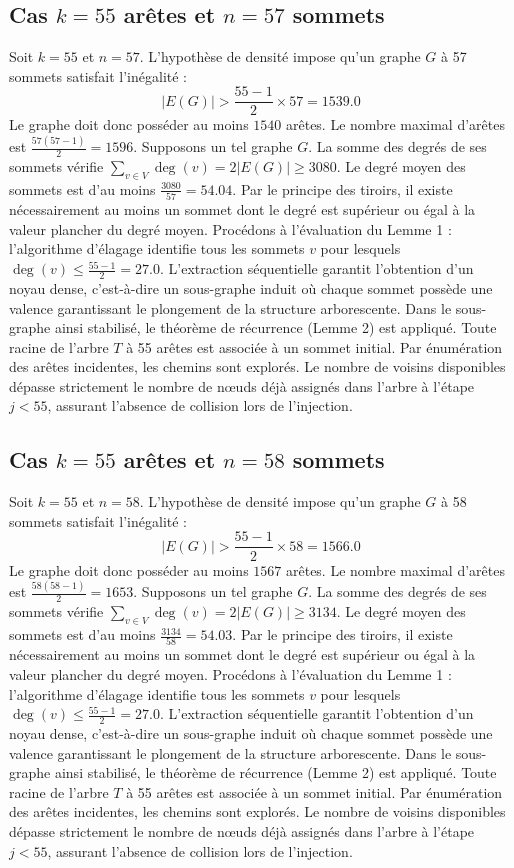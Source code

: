 \documentclass[12pt,a4paper]{article}
\begin{document}
\subsection{Cas $k = 55$ arêtes et $n = 57$ sommets}
Soit $k = 55$ et $n = 57$. L'hypothèse de densité impose qu'un graphe $G$ à 57 sommets satisfait l'inégalité :
$$ |E(G)| > \frac{55-1}{2} \times 57 = 1539.0 $$
Le graphe doit donc posséder au moins $1540$ arêtes. Le nombre maximal d'arêtes est $\frac{57(57-1)}{2} = 1596$.
Supposons un tel graphe $G$. La somme des degrés de ses sommets vérifie $\sum_{v \in V} \deg(v) = 2|E(G)| \geq 3080$.
Le degré moyen des sommets est d'au moins $\frac{3080}{57} = 54.04$.
Par le principe des tiroirs, il existe nécessairement au moins un sommet dont le degré est supérieur ou égal à la valeur plancher du degré moyen.
Procédons à l'évaluation du Lemme 1 : l'algorithme d'élagage identifie tous les sommets $v$ pour lesquels $\deg(v) \leq \frac{55-1}{2} = 27.0$.
L'extraction séquentielle garantit l'obtention d'un noyau dense, c'est-à-dire un sous-graphe induit où chaque sommet possède une valence garantissant le plongement de la structure arborescente.
Dans le sous-graphe ainsi stabilisé, le théorème de récurrence (Lemme 2) est appliqué. Toute racine de l'arbre $T$ à 55 arêtes est associée à un sommet initial. Par énumération des arêtes incidentes, les chemins sont explorés. Le nombre de voisins disponibles dépasse strictement le nombre de nœuds déjà assignés dans l'arbre à l'étape $j < 55$, assurant l'absence de collision lors de l'injection.

\subsection{Cas $k = 55$ arêtes et $n = 58$ sommets}
Soit $k = 55$ et $n = 58$. L'hypothèse de densité impose qu'un graphe $G$ à 58 sommets satisfait l'inégalité :
$$ |E(G)| > \frac{55-1}{2} \times 58 = 1566.0 $$
Le graphe doit donc posséder au moins $1567$ arêtes. Le nombre maximal d'arêtes est $\frac{58(58-1)}{2} = 1653$.
Supposons un tel graphe $G$. La somme des degrés de ses sommets vérifie $\sum_{v \in V} \deg(v) = 2|E(G)| \geq 3134$.
Le degré moyen des sommets est d'au moins $\frac{3134}{58} = 54.03$.
Par le principe des tiroirs, il existe nécessairement au moins un sommet dont le degré est supérieur ou égal à la valeur plancher du degré moyen.
Procédons à l'évaluation du Lemme 1 : l'algorithme d'élagage identifie tous les sommets $v$ pour lesquels $\deg(v) \leq \frac{55-1}{2} = 27.0$.
L'extraction séquentielle garantit l'obtention d'un noyau dense, c'est-à-dire un sous-graphe induit où chaque sommet possède une valence garantissant le plongement de la structure arborescente.
Dans le sous-graphe ainsi stabilisé, le théorème de récurrence (Lemme 2) est appliqué. Toute racine de l'arbre $T$ à 55 arêtes est associée à un sommet initial. Par énumération des arêtes incidentes, les chemins sont explorés. Le nombre de voisins disponibles dépasse strictement le nombre de nœuds déjà assignés dans l'arbre à l'étape $j < 55$, assurant l'absence de collision lors de l'injection.
\end{document}
